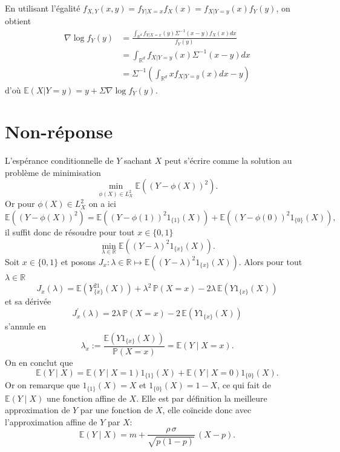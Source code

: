 \label{III-answer-tweedie3}
En utilisant l'égalité
\(f_{X,Y}(x,y) = f_{Y|X=x}f_X(x) = f_{X|Y=y}(x)f_Y(y)\), on obtient
\begin{align*}
\nabla \log f_Y(y) &= \frac{\int_{\mathbb{R}^d} f_{Y|X=x}(y) \Sigma^{-1}(x-y) f_X(x) dx}{f_Y(y)}\\
&= \int_{\mathbb{R}^d} f_{X|Y=y}(x) \Sigma^{-1}(x-y) dx \\
& = \Sigma^{-1}\left(\int_{\mathbb{R}^d} x f_{X|Y=y}(x) dx -y \right)
\end{align*} d'où \(\mathbb{E}(X|Y=y) = y + \Sigma\nabla\log f_Y(y)\).

\section{Non-réponse}\label{III-non-ruxe9ponse-1}

\label{III-answer-nonrep1}
L'espérance conditionnelle de \(Y\) sachant \(X\) peut s'écrire comme la
solution au problème de minimisation
\[\min_{\phi(X)\in L^2_X} \mathbb{E}\left(\left(Y-\phi(X)\right)^2\right).\]
Or pour \(\phi(X)\in L^2_X\) on a ici
\[\mathbb{E}\left(\left(Y-\phi(X)\right)^2\right) = \mathbb{E}\left( \left(Y - \phi(1)\right)^2 1_{\{1\}}(X) \right) + \mathbb{E}\left( \left(Y - \phi(0)\right)^2 1_{\{0\}}(X) \right),\]
il suffit donc de résoudre pour tout \(x\in\{0,1\}\)
\[\min_{\lambda \in \mathbb{R}} \mathbb{E}\left(\left(Y-\lambda\right)^2 1_{\{x\}}(X)\right).\]
Soit \(x\in\{0,1\}\) et posons
\(J_x : \lambda\in\mathbb{R}\mapsto \mathbb{E}\left(\left(Y-\lambda\right)^2 1_{\{x\}}(X)\right)\).
Alors pour tout \(\lambda\in\mathbb{R}\)
\[J_x(\lambda) = \mathbb{E}\left(Y^21_{\{x\}}(X)\right) + \lambda^2\,\mathbb{P}(X=x) -2\lambda\,\mathbb{E}\left(Y1_{\{x\}}(X)\right)\]
et sa dérivée
\[J_x^\prime(\lambda) = 2\lambda\,\mathbb{P}(X=x) -2\,\mathbb{E}\left(Y1_{\{x\}}(X)\right)\]
s'annule en
\[\lambda_x := \dfrac{\mathbb{E}\left(Y1_{\{x\}}(X)\right)}{\mathbb{P}(X=x)} = \mathbb{E}(Y\mid X = x).\]
On en conclut que
\[\mathbb{E}(Y\mid X) = \mathbb{E}(Y\mid X = 1)1_{\{1\}}(X) + \mathbb{E}(Y\mid X = 0)1_{\{0\}}(X).\]
Or on remarque que \(1_{\{1\}}(X) = X\) et \(1_{\{0\}}(X) = 1 - X\), ce
qui fait de \(\mathbb{E}(Y\mid X)\) une fonction affine de \(X\). Elle
est par définition la meilleure approximation de \(Y\) par une fonction
de \(X\), elle coïncide donc avec l'approximation affine de \(Y\) par
\(X\):
\[\mathbb{E}(Y\mid X) = m + \dfrac{\rho\,\sigma}{\sqrt{p(1-p)}}\,(X - p).\]

